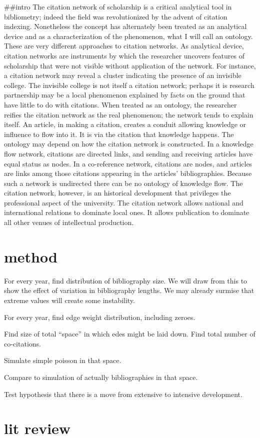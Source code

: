 \documentclass[]{book}
\theoremstyle{definition}
\theoremstyle{definition}
\theoremstyle{definition}
\theoremstyle{remark}
\begin{document}
\#\#intro The citation network of scholarship is a critical analytical
tool in bibliometry; indeed the field was revolutionized by the advent
of citation indexing. Nonetheless the concept has alternately been
treated as an analytical device and as a characterization of the
phenomenon, what I will call an ontology. These are very different
approaches to citation networks. As analytical device, citation networks
are instruments by which the researcher uncovers features of scholarship
that were not visible without application of the network. For instance,
a citation network may reveal a cluster indicating the presence of an
invisible college. The invisible college is not itself a citation
network; perhaps it is research partnership may be a local phenomenon
explained by facts on the ground that have little to do with citations.
When treated as an ontology, the researcher reifies the citation network
as the real phenomenon; the network tends to explain itself. An article,
in making a citation, creates a conduit allowing knowledge or influence
to flow into it. It is via the citation that knowledge happens. The
ontology may depend on how the citation network is constructed. In a
knowledge flow network, citations are directed links, and sending and
receiving articles have equal status as nodes. In a co-reference
network, citations are nodes, and articles are links among those
citations appearing in the articles' bibliographies. Because such a
network is undirected there can be no ontology of knowledge flow. The
citation network, however, is an historical development that privileges
the professional aspect of the university. The citation network allows
national and international relations to dominate local ones. It allows
publication to dominate all other venues of intellectual production.

\hypertarget{method-1}{%
\section{method}\label{method-1}}

For every year, find distribution of bibliography size. We will draw
from this to show the effect of variation in bibliography lengths. We
may already surmise that extreme values will create some instability.

For every year, find edge weight distribution, including zeroes.

Find size of total ``space'' in which edes might be laid down. Find
total number of co-citations.

Simulate simple poisson in that space.

Compare to simulation of actually bibliographies in that space.

Test hypothesis that there is a move from extensive to intensive
development.

\hypertarget{lit-review}{%
\section{lit review}\label{lit-review}}


\end{document}
